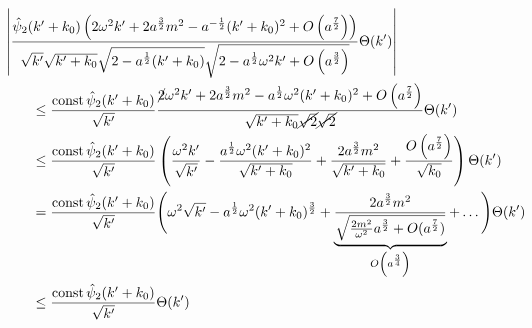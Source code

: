 \begin{align}
&\kern -2em
    \left|
    \frac{
        \hat\psi_2(k'+k_0) \left(
        2 \omega^2 k' + 2a^{\frac{3}{2}}m^2-a^{-\frac{1}{2}}(k'+k_0)^2
            + O \left(a^{\frac{7}{2}}\right)
        \right)
    }
    {
        \sqrt{k'} \sqrt{k'+k_0} \sqrt{2-a^{\frac{1}{2}}(k'+k_0)}
        \sqrt{2-a^{\frac{1}{2}}\omega^2 k' + O\left(a^{\frac{3}{2}}\right)}
    }
    \Theta(k')
    \right|
    \nonumber \\ &\leq
    \frac{\textrm{const}\,\hat\psi_2(k'+k_0)}{\sqrt{k'}}
    \frac{
        \cancel{2}\omega^2 k' + 2a^{\frac{3}{2}}m^2
        -a^{\frac{1}{2}} \omega^2 (k'+k_0)^2 + O\left(a^{\frac{7}{2}}\right)
    }
    {
        \sqrt{k' + k_0}\cancel{\sqrt{2}} \cancel{\sqrt{2}}
    }\Theta(k')
    \nonumber \\ &\leq
    \frac{\textrm{const}\, \hat\psi_2(k'+k_0)}{\sqrt{k'}}
    \left(
        \frac{\omega^2 k'}{\sqrt{k'}}
        - \frac{a^{\frac{1}{2}}\omega^2(k'+k_0)^2}{\sqrt{k'+k_0}}
        + \frac{2a^{\frac{3}{2}}m^2}{\sqrt{k'+k_0}}
        + \frac{O\left(a^{\frac{7}{2}}\right)}{\sqrt{k_0}}
    \right)\Theta(k')
    \nonumber \\ &=
    \frac{\textrm{const}\, \hat\psi_2(k'+k_0)}{\sqrt{k'}}
    \Bigg(
        \omega^2 \sqrt{k'} - a^{\frac{1}{2}}\omega^2 (k'+k_0)^{\frac{3}{2}}
        + \underbrace{\frac{2a^{\frac{3}{2}}m^2}
                    {\sqrt{\frac{2m^2}{\omega^2}a^{\frac{3}{2}}+O(a^{\frac{7}{2}})}}}_{O\left(a^{\frac{3}{4}}\right)}
        + \dots
    \Bigg)\Theta(k')
    \nonumber \\&\leq
    \frac{\textrm{const}\, \hat\psi_2(k'+k_0)}{\sqrt{k'}}\Theta(k')
    \label{eq:lange_1/sqrt_abschaetzerei}
\end{align}

